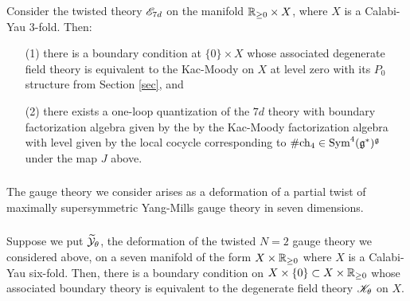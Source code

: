 \begin{thm} Consider the twisted theory $\mathscr E_{7d}$ on the manifold $\mathbb R_{\geq 0} \times X$, where $X$ is a Calabi-Yau $3$-fold. 
Then:
\begin{itemize}
\item[(1)] there is a boundary condition at $\{0\} \times X$ whose associated degenerate field theory is equivalent to the Kac-Moody on $X$ at level zero with its $P_0$ structure from Section \ref{sec}, and
\item[(2)] there exists a one-loop quantization of the $7d$ theory with boundary factorization algebra given by the by the Kac-Moody factorization algebra with level given by the local cocycle corresponding to $\# {\rm ch}_4 \in {\rm Sym}^4(\mathfrak g^*)^\mathfrak g$ under the map $J$ above. 
\end{itemize}
\end{thm}

\subsubsection{}

The gauge theory we consider arises as a deformation of a partial twist of maximally supersymmetric Yang-Mills gauge theory in seven dimensions. 

\subsubsection{}

\begin{thm} Suppose we put $\widetilde{\mathcal Y}_\theta$, the deformation of the twisted $N=2$ gauge theory we considered above, on a seven manifold of the form $X \times \mathbb R_{\geq 0}$ where $X$ is a Calabi-Yau six-fold. Then, there is a boundary condition on $X \times \{0\} \subset X \times \mathbb R_{\geq 0}$ whose associated boundary theory is equivalent to the degenerate field theory $\mathscr K_\theta$ on $X$. 
\end{thm}
